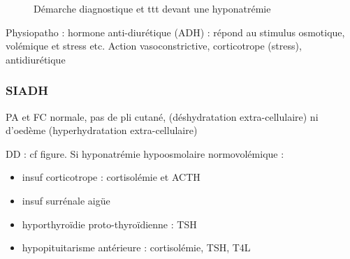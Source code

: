 \documentclass{book}
\begin{document}
\begin{figure}[htpb]
  \centering
  \caption{Démarche diagnostique et ttt devant une hyponatrémie}
\end{figure}

Physiopatho : hormone anti-diurétique (ADH) : répond au stimulus osmotique,
volémique et stress etc. Action vasoconstrictive, corticotrope (stress),
antidiurétique

\subsubsection{SIADH}
\label{sec:org5c81647}
PA et FC normale, pas de pli cutané, (déshydratation extra-cellulaire) ni
d'oedème (hyperhydratation extra-cellulaire)

DD : cf figure. Si hyponatrémie hypoosmolaire normovolémique :
\begin{itemize}
\item insuf corticotrope : cortisolémie et ACTH
\item insuf surrénale aigüe
\item hyporthyroïdie proto-thyroïdienne : TSH \inc
\item hypopituitarisme antérieure : cortisolémie, TSH, T4L
\end{itemize}
\end{document}
